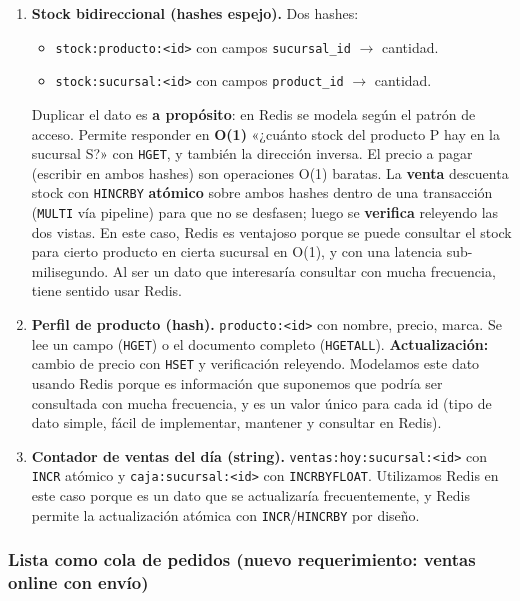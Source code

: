 \documentclass[11pt,a4paper]{article}
\begin{document}
\begin{enumerate}[leftmargin=*]
    \item \textbf{Stock bidireccional (hashes espejo).} Dos hashes:
    \begin{itemize}[nosep]
        \item \texttt{stock:producto:<id>} con campos \texttt{sucursal\_id} $\rightarrow$ cantidad.
        \item \texttt{stock:sucursal:<id>} con campos \texttt{product\_id} $\rightarrow$ cantidad.
    \end{itemize}
    Duplicar el dato es \textbf{a propósito}: en Redis se modela según el patrón de acceso.
    Permite responder en \textbf{O(1)} «¿cuánto stock del producto P hay en la sucursal S?»
    con \texttt{HGET}, y también la dirección inversa. El precio a pagar (escribir en ambos
    hashes) son operaciones O(1) baratas. La \textbf{venta} descuenta stock con
    \texttt{HINCRBY} \textbf{atómico} sobre ambos hashes dentro de una transacción
    (\texttt{MULTI} vía pipeline) para que no se desfasen; luego se \textbf{verifica}
    releyendo las dos vistas. En este caso, Redis es ventajoso porque se puede consultar el
    stock para cierto producto en cierta sucursal en O(1), y con una latencia
    sub-milisegundo. Al ser un dato que interesaría consultar con mucha frecuencia, tiene
    sentido usar Redis.

    \item \textbf{Perfil de producto (hash).} \texttt{producto:<id>} con nombre, precio,
    marca. Se lee un campo (\texttt{HGET}) o el documento completo (\texttt{HGETALL}).
    \textbf{Actualización:} cambio de precio con \texttt{HSET} y verificación releyendo.
    Modelamos este dato usando Redis porque es información que suponemos que podría ser
    consultada con mucha frecuencia, y es un valor único para cada id (tipo de dato simple,
    fácil de implementar, mantener y consultar en Redis).

    \item \textbf{Contador de ventas del día (string).}
    \texttt{ventas:hoy:sucursal:<id>} con \texttt{INCR} atómico y
    \texttt{caja:sucursal:<id>} con \texttt{INCRBYFLOAT}. Utilizamos Redis en este caso
    porque es un dato que se actualizaría frecuentemente, y Redis permite la actualización
    atómica con \texttt{INCR}/\texttt{HINCRBY} por diseño.
\end{enumerate}

\subsubsection{Lista como cola de pedidos (nuevo requerimiento: ventas online con envío)}
\end{document}
